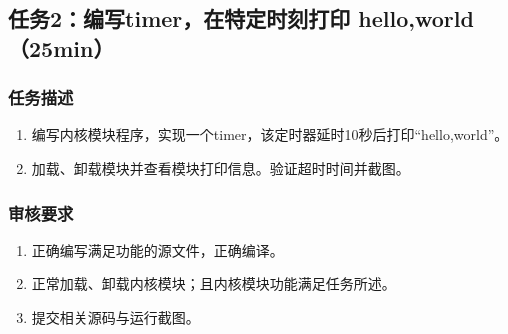 \documentclass{article}
\begin{document}
\newpage


\subsection{任务2：编写timer，在特定时刻打印 hello,world（25min）}

\subsubsection{任务描述}
\begin{enumerate}
	\item 编写内核模块程序，实现一个timer，该定时器延时10秒后打印“hello,world”。
	\item 加载、卸载模块并查看模块打印信息。验证超时时间并截图。
\end{enumerate}

\subsubsection{审核要求}
\begin{enumerate}
	\item 正确编写满足功能的源文件，正确编译。
	\item 正常加载、卸载内核模块；且内核模块功能满足任务所述。
	\item 提交相关源码与运行截图。
\end{enumerate}
\end{document}
